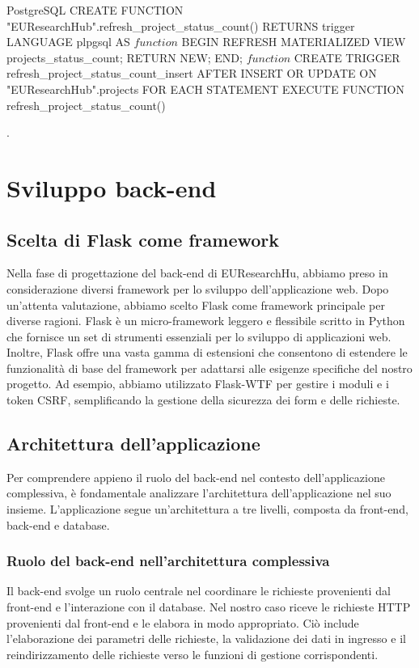 \documentclass{report}
\begin{document}
\begin{itemize}
\begin{minipage}{\linewidth}
\begin{imtaCode}{PostgreSQL}
CREATE FUNCTION "EUResearchHub".refresh_project_status_count()
 RETURNS trigger
 LANGUAGE plpgsql
AS $function$
BEGIN
  REFRESH MATERIALIZED VIEW projects_status_count;
  RETURN NEW;
END;
$function$
CREATE TRIGGER refresh_project_status_count_insert 
AFTER INSERT OR UPDATE
ON "EUResearchHub".projects 
FOR EACH STATEMENT
EXECUTE FUNCTION refresh_project_status_count()
\end{imtaCode}
\end{minipage}



\end{itemize}








.
\chapter{Sviluppo back-end}

\section{Scelta di Flask come framework}
Nella fase di progettazione del back-end di EUResearchHu,  abbiamo preso in considerazione diversi framework per lo sviluppo dell'applicazione web. Dopo un'attenta valutazione, abbiamo scelto Flask come framework principale per diverse ragioni.
Flask è un micro-framework leggero e flessibile scritto in Python che fornisce un set di strumenti essenziali per lo sviluppo di applicazioni web. 
Inoltre, Flask offre una vasta gamma di estensioni che consentono di estendere le funzionalità di base del framework per adattarsi alle esigenze specifiche del nostro progetto. Ad esempio, abbiamo utilizzato Flask-WTF per gestire i moduli e i token CSRF, semplificando la gestione della sicurezza dei form e delle richieste.
\section{Architettura dell'applicazione}
Per comprendere appieno il ruolo del back-end nel contesto dell'applicazione complessiva, è fondamentale analizzare l'architettura dell'applicazione nel suo insieme.
L'applicazione segue un'architettura a tre livelli, composta da front-end, back-end e database. \\
\subsection{Ruolo del back-end nell'architettura complessiva}
Il back-end svolge un ruolo centrale nel coordinare le richieste provenienti dal front-end e l'interazione con il database. Nel nostro caso riceve le richieste HTTP provenienti dal front-end e le elabora in modo appropriato. Ciò include l'elaborazione dei parametri delle richieste, la validazione dei dati in ingresso e il reindirizzamento delle richieste verso le funzioni di gestione corrispondenti.\\
\end{document}
